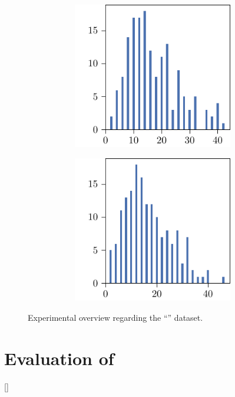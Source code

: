 \begin{figure}[p]
\begin{subfigure}{\textwidth}
\begin{subfigure}{\mymultiouter}
          \includegraphics[width=\mymultiinner]{figures/new/manhattan-princess-qlibra-retraining}
    \end{subfigure}
    \begin{subfigure}{\mymultiouter}
        \centering
          \includegraphics[width=\mymultiinner]{figures/new/manhattan-princess-permutation-retraining}
      \end{subfigure}
  \end{subfigure}
    \caption{Experimental overview regarding the ``\princess{}'' dataset.}
\end{figure}


\section{Evaluation of \qlibraname{}}[\qlibraname]

